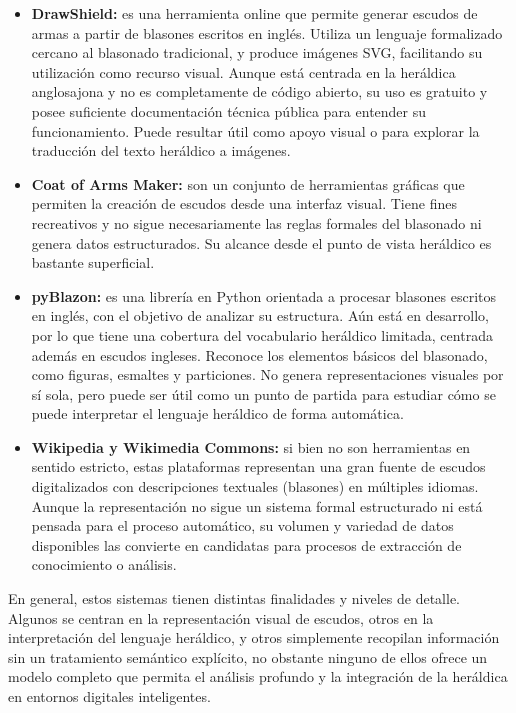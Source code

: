 \begin{itemize}
    \item \textbf{DrawShield:} es una herramienta online que permite generar escudos de armas
    a partir de blasones escritos en inglés. Utiliza un lenguaje formalizado cercano al blasonado
    tradicional, y produce imágenes SVG, facilitando su utilización como recurso visual. Aunque está 
    centrada en la heráldica anglosajona y no es completamente de código abierto, su 
    uso es gratuito y posee suficiente documentación técnica pública para entender su 
    funcionamiento. Puede resultar útil como apoyo visual o para explorar la traducción del
    texto heráldico a imágenes.
    \item \textbf{Coat of Arms Maker:} son un conjunto de herramientas gráficas que permiten
    la creación de escudos desde una interfaz visual. Tiene fines recreativos y no sigue
    necesariamente las reglas formales del blasonado ni genera datos estructurados. Su alcance
    desde el punto de vista heráldico es bastante superficial.
    \item \textbf{pyBlazon:} es una librería en Python orientada a procesar blasones escritos en
    inglés, con el objetivo de analizar su estructura. Aún está en desarrollo, por lo que tiene
    una cobertura del vocabulario heráldico limitada, centrada además en escudos ingleses.
    Reconoce los elementos básicos del blasonado, como figuras, esmaltes y particiones.
    No genera representaciones visuales por sí sola, pero puede ser útil como un punto de partida
    para estudiar cómo se puede interpretar el lenguaje heráldico de forma automática.
    \item \textbf{Wikipedia y Wikimedia Commons:} si bien no son herramientas en sentido estricto,
    estas plataformas representan una gran fuente de escudos digitalizados con descripciones
    textuales (blasones) en múltiples idiomas. Aunque la representación no sigue un sistema formal 
    estructurado ni está pensada para el proceso automático, su volumen y variedad de datos
    disponibles las convierte en candidatas para procesos de extracción de conocimiento o análisis.
\end{itemize}

En general, estos sistemas tienen distintas finalidades y niveles de detalle. Algunos se centran
en la representación visual de escudos, otros en la interpretación del lenguaje heráldico, y
otros simplemente recopilan información sin un tratamiento semántico explícito, no obstante ninguno
de ellos ofrece un modelo completo que permita el análisis profundo y la integración de la 
heráldica en entornos digitales inteligentes.

